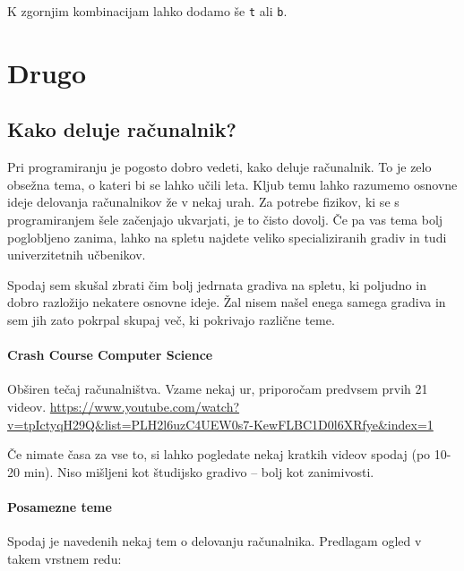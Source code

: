 \documentclass[
]{report}
\begin{document}
K zgornjim kombinacijam lahko dodamo še \texttt{t} ali \texttt{b}.

\hypertarget{drugo}{%
\chapter{Drugo}\label{drugo}}

\hypertarget{kako-deluje-raux10dunalnik}{%
\section{Kako deluje računalnik?}\label{kako-deluje-raux10dunalnik}}

Pri programiranju je pogosto dobro vedeti, kako deluje računalnik. To je zelo obsežna tema, o kateri bi se lahko učili leta. Kljub temu lahko razumemo osnovne ideje delovanja računalnikov že v nekaj urah. Za potrebe fizikov, ki se s programiranjem šele začenjajo ukvarjati, je to čisto dovolj. Če pa vas tema bolj poglobljeno zanima, lahko na spletu najdete veliko specializiranih gradiv in tudi univerzitetnih učbenikov.

Spodaj sem skušal zbrati čim bolj jedrnata gradiva na spletu, ki poljudno in dobro razložijo nekatere osnovne ideje. Žal nisem našel enega samega gradiva in sem jih zato pokrpal skupaj več, ki pokrivajo različne teme.

\hypertarget{crash-course-computer-science}{%
\subsubsection*{Crash Course Computer Science}\label{crash-course-computer-science}}

Obširen tečaj računalništva. Vzame nekaj ur, priporočam predvsem prvih 21 videov.
\url{https://www.youtube.com/watch?v=tpIctyqH29Q\&list=PLH2l6uzC4UEW0s7-KewFLBC1D0l6XRfye\&index=1}

Če nimate časa za vse to, si lahko pogledate nekaj kratkih videov spodaj (po 10-20 min). Niso mišljeni kot študijsko gradivo -- bolj kot zanimivosti.

\hypertarget{posamezne-teme}{%
\subsubsection*{Posamezne teme}\label{posamezne-teme}}

Spodaj je navedenih nekaj tem o delovanju računalnika. Predlagam ogled v takem vrstnem redu:
\end{document}
